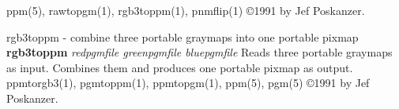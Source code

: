 ppm(5), rawtopgm(1), rgb3toppm(1), pnmflip(1)
\copyright 1991 by Jef Poskanzer.
%
 
%

\newpage
%

rgb3toppm - combine three portable graymaps into one portable pixmap
{\bf rgb3toppm}
{\it redpgmfile greenpgmfile bluepgmfile}
Reads three portable graymaps as input.
Combines them and produces one portable pixmap as output.
ppmtorgb3(1), pgmtoppm(1), ppmtopgm(1), ppm(5), pgm(5)
\copyright 1991 by Jef Poskanzer.
%
 
%

